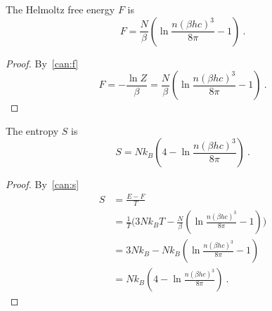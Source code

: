     The Helmoltz free energy $F$ is 
    \begin{equation*}
        F = \frac{N}{\beta} (\ln \frac{n (\beta h c)^3}{8\pi} - 1) ~.
    \end{equation*}
    \begin{proof}
        By~\eqref{can:f}
        \begin{equation*}
            F = - \frac{\ln Z}{\beta} = \frac{N}{\beta} (\ln \frac{n (\beta h c)^3}{8\pi} - 1) ~.
        \end{equation*}
    \end{proof}
    
    The entropy $S$ is 
    \begin{equation*}
        S = N k_B (4 - \ln \frac{n (\beta h c)^3}{8\pi} ) ~.
    \end{equation*}
    \begin{proof}
        By~\eqref{can:s}
        \begin{equation*}
        \begin{aligned}
            S & = \frac{E - F}{T} \\ & = \frac{1}{T} \Big ( 3 N k_B T - \frac{N}{\beta} (\ln \frac{n (\beta h c)^3}{8\pi} - 1)  \Big ) \\ & = 3 N k_B - N k_B (\ln \frac{n (\beta h c)^3}{8\pi} - 1) \\ & = N k_B (4 - \ln \frac{n (\beta h c)^3}{8\pi} ) ~.
        \end{aligned}
        \end{equation*}
    \end{proof}

